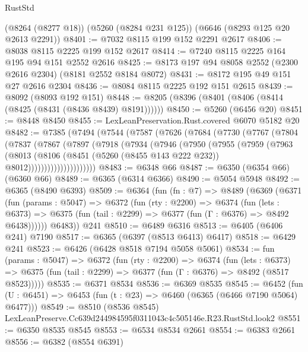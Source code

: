 \begin{lexlean}{RustStd}
\begin{coremodule}
    (@8264 (@8277 @18))
    (@5260 (@8284 @231 @125))
    (@6646 (@8293 @125 @20 @2613 @2291))
@8401 := @7032 @8115 @199 @152 @2291 @2617
@8406 := @8038 @8115 @2225 @199 @152 @2617
@8414 := @7240 @8115 @2225 @164 @195 @94 @151 @2552 @2616
@8425 := @8173 @197 @94 @8058 @2552 (@2300 @2616 @2304) (@8181 @2552 @8184 @8072)
@8431 := @8172 @195 @49 @151 @27 @2616 @2304
@8436 := @8084 @8115 @2225 @192 @151 @2615
@8439 := @8092 (@8093 @192 @151)
@8448 := @8205 (@8396 (@8401 (@8406 (@8414 (@8425 (@8431 (@8436 @8439) @8191))))))
@8450 := @5260 (@6456 @20)
@8451 := @8448 @8450
@8455 := LexLeanPreservation.Rust.covered @6070 @5182 @20
@8482 := @7385
    (@7494
      (@7544
        (@7587
          (@7626
            (@7684
              (@7730
                (@7767
                  (@7804
                    (@7837
                      (@7867
                        (@7897
                          (@7918
                            (@7934
                              (@7946
                                (@7950
                                  (@7955
                                    (@7959
                                      (@7963
                                        (@8013
                                          (@8106
                                            (@8451
                                              (@5260 (@8455 @143 @222 @232))
                                              @8012)))))))))))))))))))))
@8483 := @6348 @66
@8487 := @6350 (@6354 @66) (@6360 @66)
@8489 := @6365 (@6314 @6366)
@8490 := @5054 @5948
@8492 := @6365 (@8490 @6393)
@8509 := @6364
    (fun (fn : @7) =>
    @8489
      (@6369
        (@6371
          (fun (params : @5047) =>
          @6372
            (fun (rty : @2200) =>
            @6374
              (fun (lets : @6373) =>
              @6375 (fun (tail : @2299) => @6377 (fun (Γ : @6376) => @8492 @6438))))))
        @6483))
    @241
@8510 := @6489 @6316
@8513 := @6405 (@6406 @241) @7190
@8517 := @6365 (@6397 (@8513 @6413) @6417)
@8518 := @6429 @241
@8523 := @6426 (@6428 @8518 @7194 @5058 @5061)
@8534 := fun (params : @5047) =>
  @6372
    (fun (rty : @2200) =>
    @6374
      (fun (lets : @6373) =>
      @6375 (fun (tail : @2299) => @6377 (fun (Γ : @6376) => @8492 (@8517 @8523)))))
@8535 := @6371 @8534
@8536 := @6369 @8535
@8545 := @6452 (fun (U : @6451) => @6453 (fun (t : @23) => @6460 (@6365 (@6466 @7190 @5064) @6477)))
@8549 := @8510 (@8536 @8545) LexLeanPreserve.Cc639d244984595f0311043c4c505146e.R23.RustStd.look2
@8551 := @6350 @8535 @8545
@8553 := @6534 @8534 @2661
@8554 := @6383 @2661
@8556 := @6382 (@8554 @6391)

\end{coremodule}
\end{lexlean}
